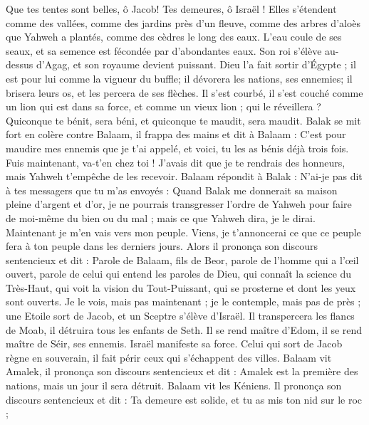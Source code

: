 \begin{multicols}{2}
Que tes tentes sont belles, ô Jacob! Tes demeures, ô Israël !
Elles s’étendent comme des vallées, comme des jardins près d'un fleuve, comme des arbres d'aloès que Yahweh a plantés, comme des cèdres le long des eaux.
L'eau coule de ses seaux, et sa semence est fécondée par d’abondantes eaux. Son roi s’élève au-dessus d’Agag, et son royaume devient puissant.
Dieu l'a fait sortir d'Égypte ; il est pour lui comme la vigueur du buffle; il dévorera les nations, ses ennemies; il brisera leurs os, et les percera de ses flèches.
Il s'est courbé, il s'est couché comme un lion qui est dans sa force, et comme un vieux lion ; qui le réveillera ? Quiconque te bénit, sera béni, et quiconque te maudit, sera maudit.
Balak se mit fort en colère contre Balaam, il frappa des mains et dit à Balaam : C’est pour maudire mes ennemis que je t’ai appelé, et voici, tu les as bénis déjà trois fois.
Fuis maintenant, va-t’en chez toi ! J'avais dit que je te rendrais des honneurs, mais Yahweh t'empêche de les recevoir.
Balaam répondit à Balak : N'ai-je pas dit à tes messagers que tu m’as envoyés :
Quand Balak me donnerait sa maison pleine d'argent et d'or, je ne pourrais transgresser l’ordre de Yahweh pour faire de moi-même du bien ou du mal ; mais ce que Yahweh dira, je le dirai.
Maintenant je m'en vais vers mon peuple. Viens, je t’annoncerai ce que ce peuple fera à ton peuple dans les derniers jours.
Alors il prononça son discours sentencieux et dit : Parole de Balaam, fils de Beor, parole de l'homme qui a l'œil ouvert,
parole de celui qui entend les paroles de Dieu, qui connaît la science du Très-Haut, qui voit la vision du Tout-Puissant, qui se prosterne et dont les yeux sont ouverts.
Je le vois, mais pas maintenant ; je le contemple, mais pas de près ; une Etoile sort de Jacob, et un Sceptre s’élève d’Israël. Il transpercera les flancs de Moab, il détruira tous les enfants de Seth.
Il se rend maître d’Edom, il se rend maître de Séir, ses ennemis. Israël manifeste sa force.
Celui qui sort de Jacob règne en souverain, il fait périr ceux qui s’échappent des villes.
Balaam vit Amalek, il prononça son discours sentencieux et dit : Amalek est la première des nations, mais un jour il sera détruit.
Balaam vit les Kéniens. Il prononça son discours sentencieux et dit : Ta demeure est solide, et tu as mis ton nid sur le roc ;

\end{multicols}
